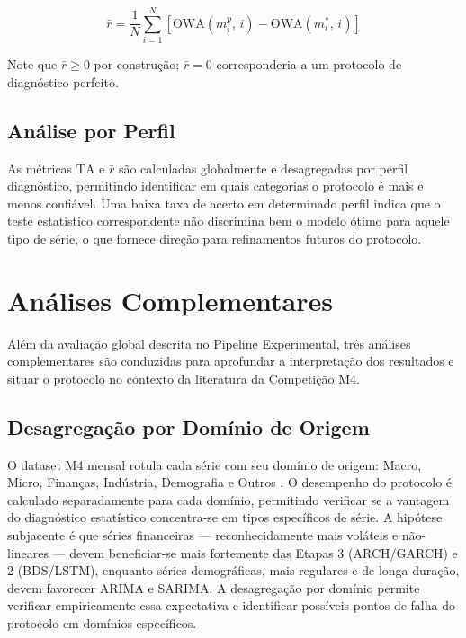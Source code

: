 \documentclass[
  12pt,
  openright,
  twoside,
  a4paper,
  english,
  brazil
]{abntex2}
\begin{document}
\begin{equation}
  \bar{r} = \frac{1}{N} \sum_{i=1}^{N} \left[\text{OWA}(m^p_i,\, i) - \text{OWA}(m^*_i,\, i)\right]
  \label{eq:arrependimento}
\end{equation}

Note que $\bar{r} \geq 0$ por construção; $\bar{r} = 0$ corresponderia a um protocolo de diagnóstico perfeito.

\subsection{Análise por Perfil}
\label{subsec:acerto-por-perfil}

As métricas $\text{TA}$ e $\bar{r}$ são calculadas globalmente e desagregadas por perfil diagnóstico, permitindo identificar em quais categorias o protocolo é mais e menos confiável. Uma baixa taxa de acerto em determinado perfil indica que o teste estatístico correspondente não discrimina bem o modelo ótimo para aquele tipo de série, o que fornece direção para refinamentos futuros do protocolo.

\section{Análises Complementares}
\label{sec:analises-complementares}

Além da avaliação global descrita no Pipeline Experimental, três análises complementares são conduzidas para aprofundar a interpretação dos resultados e situar o protocolo no contexto da literatura da Competição M4.

\subsection{Desagregação por Domínio de Origem}
\label{subsec:analise-dominio}

O dataset M4 mensal rotula cada série com seu domínio de origem: Macro, Micro, Finanças, Indústria, Demografia e Outros \cite{makridakis2020m4}. O desempenho do protocolo é calculado separadamente para cada domínio, permitindo verificar se a vantagem do diagnóstico estatístico concentra-se em tipos específicos de série. A hipótese subjacente é que séries financeiras — reconhecidamente mais voláteis e não-lineares — devem beneficiar-se mais fortemente das Etapas 3 (ARCH/GARCH) e 2 (BDS/LSTM), enquanto séries demográficas, mais regulares e de longa duração, devem favorecer ARIMA e SARIMA. A desagregação por domínio permite verificar empiricamente essa expectativa e identificar possíveis pontos de falha do protocolo em domínios específicos.
\end{document}
